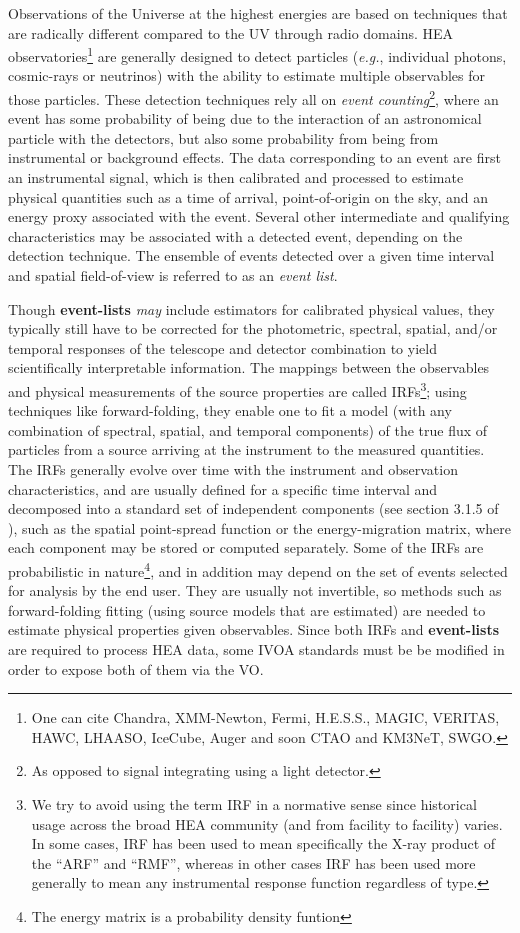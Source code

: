 \documentclass[11pt,a4paper]{ivoa}
\begin{document}
Observations of the Universe at the highest energies are based on techniques that are radically different compared to the UV through radio domains. \gls{HEA} observatories\footnote{One can cite Chandra, XMM-Newton, Fermi, H.E.S.S., MAGIC, VERITAS, HAWC, LHAASO, IceCube, Auger and soon CTAO and KM3NeT, SWGO.} are generally designed to detect particles ({\em e.g.\/}, individual photons, cosmic-rays or neutrinos) with the ability to estimate multiple observables for those particles. These detection techniques rely all on \emph{event counting}\footnote{As opposed to signal integrating using a light detector.}, where an event has some probability of being due to the interaction of an astronomical particle with the detectors, but also some probability from being from instrumental or background effects. The data corresponding to an event are first an instrumental signal, which is then calibrated and processed to estimate physical quantities such as a time of arrival, point-of-origin on the sky, and an energy proxy associated with the event. Several other intermediate and qualifying characteristics may be associated with a detected event, depending on the detection technique. The ensemble of events detected over a given time interval and spatial field-of-view is referred to as an \emph{event list}.

Though \textbf{event-lists} \emph{may} include estimators for calibrated physical values, they typically still have to be corrected for the photometric, spectral, spatial, and/or temporal responses of the telescope and detector combination to yield scientifically interpretable information. The mappings between the observables and physical measurements of the source properties are called \glspl{IRF}\footnote{We try to avoid using the term \gls{IRF} in a normative sense since historical usage across the broad \gls{HEA} community (and from facility to facility) varies. In some cases, \gls{IRF} has been used to mean specifically the X-ray product of the ``ARF'' and ``RMF'', whereas in other cases \gls{IRF}
has been used more generally to mean any instrumental response function regardless of type.}; using techniques like forward-folding, they enable one to fit a model (with any combination of spectral, spatial, and temporal components) of the true flux of particles from a source arriving at the instrument to the measured quantities. The \glspl{IRF} generally evolve over time with the instrument and observation characteristics, and are usually defined for a specific time interval and decomposed into a standard set of independent components (see section 3.1.5 of \citep{2024ivoa.note.heig}), such as the spatial point-spread function or the energy-migration matrix, where each component may be stored or computed separately.  Some of the \glspl{IRF} are probabilistic in nature\footnote{The energy matrix is a probability density funtion}, and in addition may depend on the set of events selected for analysis by the end user. They are usually not invertible, so methods such as forward-folding fitting (using source models that are estimated) are needed to estimate physical properties given observables. Since both \glspl{IRF} and \textbf{event-lists} are required to process \gls{HEA} data, some \gls{IVOA} standards must be be modified in order to expose both of them via the \gls{VO}.
\end{document}
